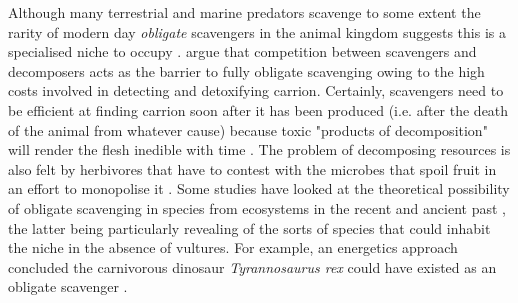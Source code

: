 Although many terrestrial and marine predators scavenge to some extent \citep{britton1994marine,devault2003scavenging,ruxton2004energetic} the rarity of modern day \textit{obligate} scavengers in the animal kingdom suggests this is a specialised niche to occupy \citep{ruxton2004energetic,ruxton2004obligate}. \cite{devault2003scavenging} argue that competition between scavengers and decomposers acts as the barrier to fully obligate scavenging owing to the high costs involved in detecting and detoxifying carrion. Certainly, scavengers need to be efficient at finding carrion soon after it has been produced (i.e. after the death of the animal from whatever cause) because toxic "products of decomposition" will render the flesh inedible with time \citep{devault2003scavenging}. The problem of decomposing resources is also felt by herbivores that have to contest with the microbes that spoil fruit in an effort to monopolise it \citep{ruxton2014fruit}. Some studies have looked at the theoretical possibility of obligate scavenging in species from ecosystems in the recent and ancient past \citep{ruxton2013endurance,ruxton2004obligate,ruxton2003could,carbone2011intra}, the latter being particularly revealing of the sorts of species that could inhabit the niche in the absence of vultures. For example, an energetics approach concluded the carnivorous dinosaur \textit{Tyrannosaurus rex} could have existed as an obligate scavenger \citep{ruxton2003could}. 

